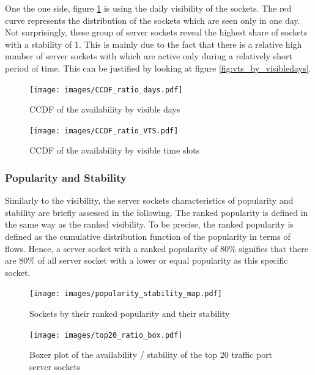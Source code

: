 One the one side, figure \ref{fig:ccdf_ratio_days} is using the daily visibility 
of the sockets. The red curve represents the distribution of the sockets which 
are seen only in one day. Not surprisingly, these group of server sockets reveal 
the highest share of sockets with a stability of 1. This is mainly due to the 
fact that there is a relative high number of server sockets with which are 
active only during a relatively short period of time. This can be justified by 
looking at figure \ref{fig:vts_by_visibledays}.



\begin{landscape}
\begin{figure}
	[p] \centering 
	\texttt{[image: images/CCDF\_ratio\_days.pdf]}
	\caption{CCDF of the availability by visible days} 
	\label{fig:ccdf_ratio_days} 
\end{figure}
\end{landscape}

\begin{landscape}
\begin{figure}
	[p] \centering 
	\texttt{[image: images/CCDF\_ratio\_VTS.pdf]}
	\caption{CCDF of the availability by visible time slots} 
	\label{fig:ccdf_ratio_vts} 
\end{figure}
\end{landscape}

\subsubsection{Popularity and Stability}
Similarly to the visibility, the server sockets characteristics of popularity 
and stability are briefly assessed in the following. The ranked popularity is 
defined in the same way as the ranked visibility. To be precise, the ranked 
popularity is defined as the cumulative distribution function of the popularity 
in terms of flows. Hence, a server socket with a ranked popularity of 80\% 
signifies that there are 80\% of all server socket with a lower or equal 
popularity as this specific socket.


\begin{figure}
	[ht] \centering 
	\texttt{[image: images/popularity\_stability\_map.pdf]}
	\caption{Sockets by their ranked popularity and their stability} 
	\label{fig:rankedPopularity} 
\end{figure}


\begin{landscape}
\begin{figure}
	[hb] \centering 
	\texttt{[image: images/top20\_ratio\_box.pdf]}
	\caption{Boxer plot of the availability / stability of the top 20 traffic port server sockets} 
	\label{fig:top20_ratio_box} 
\end{figure}
\end{landscape}


